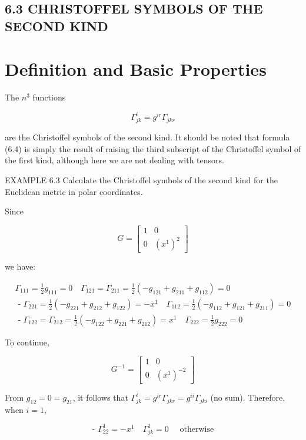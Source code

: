 \documentclass[10pt]{article}
\begin{document}
\subsection*{6.3 CHRISTOFFEL SYMBOLS OF THE SECOND KIND}
\section*{Definition and Basic Properties}
The $n^{3}$ functions


\begin{equation*}
\Gamma_{j k}^{i}=g^{i r} \Gamma_{j k r} \tag{6.4}
\end{equation*}


are the Christoffel symbols of the second kind. It should be noted that formula (6.4) is simply the result of raising the third subscript of the Christoffel symbol of the first kind, although here we are not dealing with tensors.

EXAMPLE 6.3 Calculate the Christoffel symbols of the second kind for the Euclidean metric in polar coordinates.

Since

$$
G=\left[\begin{array}{cc}
1 & 0 \\
0 & \left(x^{1}\right)^{2}
\end{array}\right]
$$

we have:

$$
\begin{gathered}
\Gamma_{111}=\frac{1}{2} g_{111}=0 \quad \Gamma_{121}=\Gamma_{211}=\frac{1}{2}\left(-g_{121}+g_{211}+g_{112}\right)=0 \\
\text { - } \Gamma_{221}=\frac{1}{2}\left(-g_{221}+g_{212}+g_{122}\right)=-x^{1} \quad \Gamma_{112}=\frac{1}{2}\left(-g_{112}+g_{121}+g_{211}\right)=0 \\
\text { - } \Gamma_{122}=\Gamma_{212}=\frac{1}{2}\left(-g_{122}+g_{221}+g_{212}\right)=x^{1} \quad \Gamma_{222}=\frac{1}{2} g_{222}=0
\end{gathered}
$$

To continue,

$$
G^{-1}=\left[\begin{array}{cc}
1 & 0 \\
0 & \left(x^{1}\right)^{-2}
\end{array}\right]
$$

From $g_{12}=0=g_{21}$, it follows that $\Gamma_{j k}^{i}=g^{i r} \Gamma_{j k r}=g^{i i} \Gamma_{j k i}$ (no sum). Therefore, when $i=1$,

$$
\text { - } \Gamma_{22}^{1}=-x^{1} \quad \Gamma_{j k}^{1}=0 \quad \text { otherwise }
$$
\end{document}
